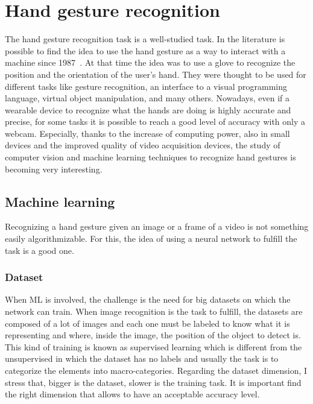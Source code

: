 \documentclass[../thesis.tex]{subfiles}
\begin{document}
\section{Hand gesture recognition}
The hand gesture recognition task is a well-studied task. In the literature is possible to find the idea to use the hand gesture as a way to interact with a machine since 1987~\cite{paper:hand_gesture_interface_device}. At that time the idea was to use a glove to recognize the position and the orientation of the user's hand. They were thought to be used for different tasks like gesture recognition, an interface to a visual programming language, virtual object manipulation, and many others. Nowadays, even if a wearable device to recognize what the hands are doing is highly accurate and precise, for some tasks it is possible to reach a good level of accuracy with only a webcam. Especially, thanks to the increase of computing power, also in small devices and the improved quality of video acquisition devices, the study of computer vision and machine learning techniques to recognize hand gestures is becoming very interesting.

\subsection{Machine learning}
Recognizing a hand gesture given an image or a frame of a video is not something easily algorithmizable. For this, the idea of using a neural network to fulfill the task is a good one.

\subsubsection{Dataset}
When \acrshort{ML} is involved, the challenge is the need for big datasets on which the network can train. When image recognition is the task to fulfill, the datasets are composed of a lot of images and each one must be labeled to know what it is representing and where, inside the image, the position of the object to detect is. This kind of training is known as supervised learning which is different from the unsupervised in which the dataset has no labels and usually the task is to categorize the elements into macro-categories. Regarding the dataset dimension, I stress that, bigger is the dataset, slower is the training task. It is important find the right dimension that allows to have an acceptable accuracy level.
\end{document}
